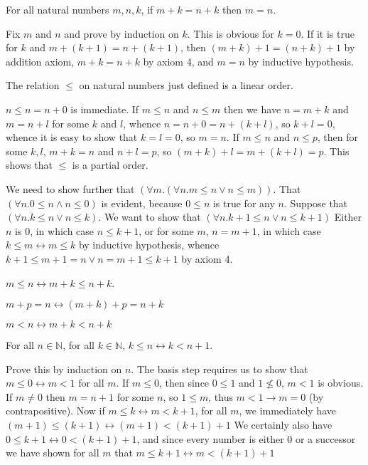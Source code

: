 \documentclass[12pt]{book}
\begin{document}
\begin{description}

\item[Theorem:] For all natural numbers $m,n,k$, if $m+k = n+k$ then
$m=n$.  

\item[Proof:] Fix $m$ and $n$ and prove by induction on $k$.  This is
obvious for $k=0$.  If it is true for $k$ and $m+(k+1) = n+(k+1)$,
then $(m+k)+1 = (n+k)+1$ by addition axiom, $m+k = n+k$ by axiom 4,
and $m=n$ by inductive hypothesis.



\item[Theorem:] The relation $\leq$ on natural numbers just defined is
a linear order. 

\item[Proof:] $n\leq n = n+0$ is immediate.  If $m\leq n$ and $n\leq
m$ then we have $n=m+k$ and $m=n+l$ for some $k$ and $l$, whence
$n=n+0=n+(k+l)$, so $k+l = 0$, whence it is easy to show that $k=l=0$,
so $m=n$.  If $m \leq n$ and $n \leq p$, then for some $k,l$, $m+k =n$
and $n+l = p$, so $(m+k)+l = m+(k+l)=p$.  This shows that $\leq$ is a partial order.  

We need to show further that $(\forall m.(\forall n.m \leq n \vee n \leq m))$.  That $(\forall n.0 \leq n \wedge n \leq 0)$ is evident, because $0 \leq n$ is true for any $n$.  Suppose that $(\forall n.k \leq n \vee n \leq k)$.  We want to show that $(\forall n.k+1 \leq n \vee n \leq k+1)$  Either $n$ is 0, in which case $n \leq k+1$, or for some $m$, $n=m+1$, in which case $k \leq m \leftrightarrow m \leq k$ by inductive hypothesis, whence $k+1 \leq m+1=n \vee n=m+1 \leq k+1$ by axiom 4.

\item[Theorem:]  $m \leq n \leftrightarrow m+k \leq n+k$.

\item  $m+p = n \leftrightarrow (m+k)+p = n+k$

\item[Corollary:] $m<n \leftrightarrow m+k <n+k$

\item[Theorem:] For all $n \in {\mathbb N}$, for all $k \in {\mathbb
N}$, $k \leq n \leftrightarrow k<n+1$.

\item[Proof:] Prove this by induction on $n$.  The basis step requires
us to show that $m \leq 0 \leftrightarrow m < 1$ for all $m$.  If $m \leq 0$,
then since $0 \leq 1$ and $1 \not\leq 0$, $m < 1$ is obvious.  If
$m\neq 0$ then $m =n+1$ for some $n$, so $1\leq m$, thus $m<1
\rightarrow m=0$ (by contrapositive).  Now if $m \leq k \leftrightarrow m <
k+1$, for all $m$, we immediately have $(m+1) \leq (k+1) \leftrightarrow
(m+1)<(k+1)+1$ We certainly also have $0\leq k+1 \leftrightarrow 0<(k+1)+1$,
and since every number is either 0 or a successor we have shown for
all $m$ that $m \leq k+1 \leftrightarrow m < (k+1)+1$


\end{description}
\end{document}

